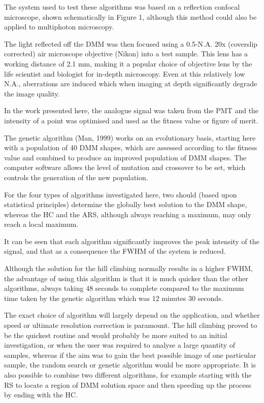 The system used to test these algorithms was based on a reflection confocal microscope, shown schematically in Figure 1, although this method could also be applied to multiphoton microscopy. 

The light reflected off the DMM was then focused using a 0.5-N.A. 20x (coverslip corrected) air microscope objective (Nikon) into a test sample. This lens has a working distance of 2.1 mm, making it a popular choice of objective lens by the life scientist and biologist for in-depth microscopy. Even at this relatively low N.A., aberrations are induced which when imaging at depth significantly degrade the image quality. 

In the work presented here, the analogue signal was taken from the PMT and the intensity of a point was optimised and used as the fitness value or figure of merit.

The genetic algorithm (Man, 1999) works on an evolutionary basis, starting here with a population of 40 DMM shapes, which are assessed according to the fitness value and combined to produce an improved population of DMM shapes. The computer software allows the level of mutation and crossover to be set, which controls the generation of the new population.

For the four types of algorithms investigated here, two should (based upon statistical principles) determine the globally best solution to the DMM shape, whereas the HC and the ARS, although always reaching a maximum, may only reach a local maximum.

It can be seen that each algorithm significantly improves the peak intensity of the signal, and that as a consequence the FWHM of the system is reduced.

Although the solution for the hill climbing normally results in a higher FWHM, the advantage of using this algorithm is that it is much quicker than the other algorithms, always taking 48 seconds to complete compared to the maximum time taken by the genetic algorithm which was 12 minutes 30 seconds.

The exact choice of algorithm will largely depend on the application, and whether speed or ultimate resolution correction is paramount. The hill climbing proved to be the quickest routine and would probably be more suited to an initial investigation, or when the user was required to analyse a large quantity of samples, whereas if the aim was to gain the best possible image of one particular sample, the random search or genetic algorithm would be more appropriate. It is also possible to combine two different algorithms, for example starting with the RS to locate a region of DMM solution space and then speeding up the process by ending with the HC.

